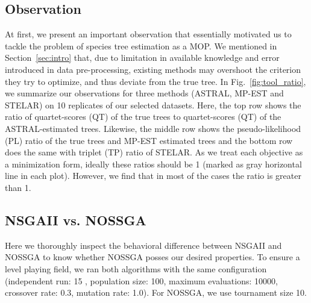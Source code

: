 \subsection{Observation}
\label{subsec:observation}
At first, we present an important observation that essentially motivated us to tackle the problem of species tree estimation as a MOP. We mentioned in Section~\ref{sec:intro} that, due to limitation in available knowledge and error introduced in data pre-processing, existing methods may overshoot the criterion they try to optimize, and thus deviate from the true tree. In Fig.~\ref{fig:tool_ratio}, we summarize our observations for three methods (ASTRAL, MP-EST and STELAR) on 10 replicates of our selected datasets. Here, the top row shows the ratio of quartet-scores (QT) of the true trees to quartet-scores (QT) of the ASTRAL-estimated trees. Likewise, the middle row shows the pseudo-likelihood (PL) ratio of the true trees and MP-EST estimated trees and the bottom row does the same with triplet (TP) ratio of STELAR. As we treat each objective as a minimization form, ideally these ratios should be 1 (marked as gray horizontal line in each plot). However, we find that in most of the cases the ratio is greater than 1. %


\subsection{NSGAII vs. NOSSGA}
Here we thoroughly inspect the behavioral difference between NSGAII and NOSSGA to know whether NOSSGA posses our desired properties. To ensure a level playing field, we ran both algorithms with the same configuration (independent run: 15 , population size: 100, maximum evaluations: 10000, crossover rate: 0.3, mutation rate: 1.0). For NOSSGA, we use tournament size 10.

